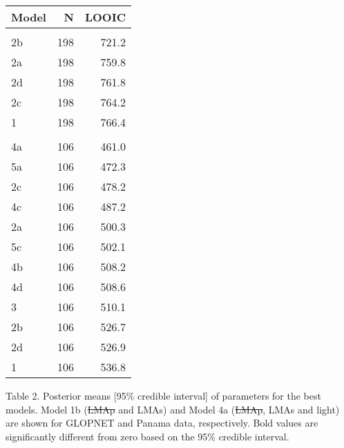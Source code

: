 \documentclass[
  12pt,
  a4paper,
,tablecaptionabove
]{scrartcl}
\providecommand{\DIFaddtex}[1]{{\protect\color{blue}\uwave{#1}}} %
\providecommand{\DIFdeltex}[1]{{\protect\color{red}\sout{#1}}}                      %
\providecommand{\DIFaddbegin}{} %
\providecommand{\DIFaddend}{} %
\providecommand{\DIFdelbegin}{} %
\providecommand{\DIFdelend}{} %
\providecommand{\DIFadd}[1]{\texorpdfstring{\DIFaddtex{#1}}{#1}} %
\providecommand{\DIFdel}[1]{\texorpdfstring{\DIFdeltex{#1}}{}} %
\newcommand{\DIFscaledelfig}{0.5}
\newlength{\DIFdelgraphicswidth} %
\newlength{\DIFdelgraphicsheight} %
\newcommand{\DIFaddincludegraphics}[2][]{{\color{blue}\fbox{\DIFOincludegraphics[#1]{#2}}}} %
\newcommand{\DIFdelincludegraphics}[2][]{%
\sbox{\DIFdelgraphicsbox}{\DIFOincludegraphics[#1]{#2}}%
\settoboxwidth{\DIFdelgraphicswidth}{\DIFdelgraphicsbox} %
\settoboxtotalheight{\DIFdelgraphicsheight}{\DIFdelgraphicsbox} %
\scalebox{\DIFscaledelfig}{%
\parbox[b]{\DIFdelgraphicswidth}{\usebox{\DIFdelgraphicsbox}\\[-\baselineskip] \rule{\DIFdelgraphicswidth}{0em}}\llap{\resizebox{\DIFdelgraphicswidth}{\DIFdelgraphicsheight}{%
\setlength{\unitlength}{\DIFdelgraphicswidth}%
\begin{picture}(1,1)%
\thicklines\linethickness{2pt} %
{\color[rgb]{1,0,0}\put(0,0){\framebox(1,1){}}}%
{\color[rgb]{1,0,0}\put(0,0){\line( 1,1){1}}}%
{\color[rgb]{1,0,0}\put(0,1){\line(1,-1){1}}}%
\end{picture}%
}\hspace*{3pt}}} %
} %
\DeclareRobustCommand{\DIFaddbegin}{\DIFOaddbegin \let\includegraphics\DIFaddincludegraphics} %
\DeclareRobustCommand{\DIFaddend}{\DIFOaddend \let\includegraphics\DIFOincludegraphics} %
\DeclareRobustCommand{\DIFdelbegin}{\DIFOdelbegin \let\includegraphics\DIFdelincludegraphics} %
\DeclareRobustCommand{\DIFdelend}{\DIFOaddend \let\includegraphics\DIFOincludegraphics} %
\begin{document}
\begin{table}
\centering
\begin{tabular}{lrr}
\toprule
Model & N & LOOIC\\
\midrule
\addlinespace[0.3em]
\multicolumn{3}{l}{\textbf{GLOPNET}}\\
\hspace{1em}2b & 198 & 721.2\\
\hspace{1em}2a & 198 & 759.8\\
\hspace{1em}2d & 198 & 761.8\\
\hspace{1em}2c & 198 & 764.2\\
\hspace{1em}1 & 198 & 766.4\\
\addlinespace[0.3em]
\multicolumn{3}{l}{\textbf{Panama}}\\
\hspace{1em}4a & 106 & 461.0\\
\hspace{1em}5a & 106 & 472.3\\
\hspace{1em}2c & 106 & 478.2\\
\hspace{1em}4c & 106 & 487.2\\
\hspace{1em}2a & 106 & 500.3\\
\hspace{1em}5c & 106 & 502.1\\
\hspace{1em}4b & 106 & 508.2\\
\hspace{1em}4d & 106 & 508.6\\
\hspace{1em}3 & 106 & 510.1\\
\hspace{1em}2b & 106 & 526.7\\
\hspace{1em}2d & 106 & 526.9\\
\hspace{1em}1 & 106 & 536.8\\
\bottomrule
\end{tabular}
\end{table}

\newpage

Table 2. Posterior means {[}95\% credible interval{]} of parameters for
the best models. Model 1b (\DIFdelbegin \DIFdel{LMAp }\DIFdelend \DIFaddbegin \DIFadd{LMAm }\DIFaddend and LMAs) and Model 4a (\DIFdelbegin \DIFdel{LMAp}\DIFdelend \DIFaddbegin \DIFadd{LMAm}\DIFaddend , LMAs and
light) are shown for GLOPNET and Panama data, respectively. Bold values
are significantly different from zero based on the 95\% credible
interval.
\end{document}
